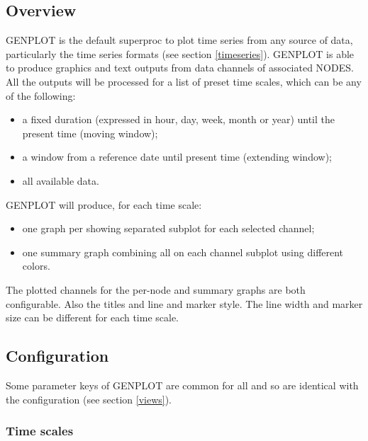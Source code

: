 \subsection{Overview}

GENPLOT is the default superproc to plot time series from any source of data, particularly the time series formats (see section \ref{timeseries}). GENPLOT is able to produce graphics and text outputs from data channels of associated NODES. All the outputs will be processed for a list of preset time scales, which can be any of the following:
\begin{itemize}
\item a fixed duration (expressed in hour, day, week, month or year) until the present time (moving window);
\item a window from a reference date until present time (extending window);
\item all available data.
\end{itemize}

GENPLOT will produce, for each time scale:
\begin{itemize}
\item one graph per  showing separated subplot for each selected channel;
\item one summary graph combining all  on each channel subplot using different colors.
\end{itemize}

The plotted channels for the per-node and summary graphs are both configurable. Also the titles and line and marker style. The line width and marker size can be different for each time scale. 

\subsection{Configuration}

Some parameter keys of GENPLOT are common for all  and  so are identical with the  configuration (see section \ref{views}).



\subsubsection{Time scales}



